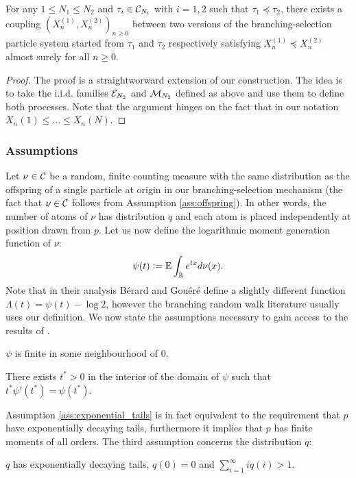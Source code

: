 \begin{lemma}\label{lem:monotonicity}
For any $1 \leq N_1 \leq N_2$ and $\tau_i \in \cal{C}_{N_i}$ with $i=1,2$ such that $\tau_1 \preceq \tau_2$, there exists a coupling $(X^{(1)}_n, X^{(2)}_n)_{n \geq 0}$ between two versions of the branching-selection particle system started from $\tau_1$ and $\tau_2$ respectively satisfying $X^{(1)}_n \preceq X^{(2)}_n$ almost surely for all $n \geq 0$. 
\end{lemma}
\begin{proof}
The proof is a straightworward extension of our construction. The idea is to take the i.i.d. families $\cal{E}_{N_2}$ and $\cal{M}_{N_2}$ defined as above and use them to define both processes. Note that the argument hinges on the fact that in our notation $X_n(1) \leq ... \leq X_n(N)$. 
\end{proof}

\subsubsection{Assumptions}

Let $\nu \in \cal{C}$ be a random, finite counting measure with the same distribution as the offspring of a single particle at origin in our branching-selection mechanism (the fact that $\nu \in \cal{C}$ follows from Assumption \ref{ass:offspring}). In other words, the number of atoms of $\nu$ has distribution $q$ and each atom is placed independently at position drawn from $p$. Let us now define the logarithmic moment generation function of $\nu$: 
\begin{equation*}
\psi(t) \defeq \E\int_\R e^{tx} d\nu (x).  
\end{equation*}
Note that in their analysis Bérard and Gouéré define a slightly different function $\Lambda(t) = \psi(t) - \log 2$, however the branching random walk literature usually uses our definition. We now state the assumptions necessary to gain access to the results of \cite{gantert2008asymptotics}. 
\begin{assumption}\label{ass:exponential_tails}
$\psi$ is finite in some neighbourhood of $0$. 
\end{assumption}
\begin{assumption}\label{ass:weird}
There exists $t^* > 0$ in the interior of the domain of $\psi$ such that $t^*\psi'(t^*) = \psi(t^*)$. 
\end{assumption}

Assumption \ref{ass:exponential_tails} is in fact equivalent to the requirement that $p$ have exponentially decaying tails, furthermore it implies that $p$ has finite moments of all orders. The third assumption concerns the distribution $q$: 
\begin{assumption}\label{ass:offspring}
$q$ has exponentially decaying tails, $q(0) = 0$ and $\sum_{i = 1}^\infty i q(i) > 1$.   
\end{assumption}

